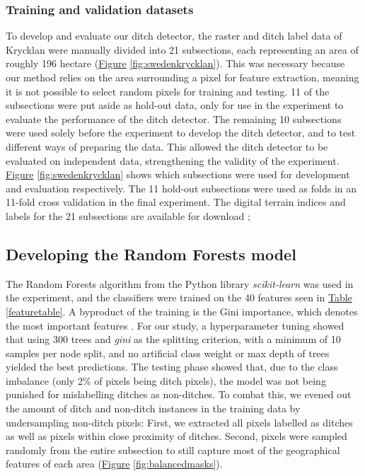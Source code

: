 \documentclass[11pt, review]{elsarticle} %
\begin{document}
\subsubsection{Training and validation datasets}
\label{trainingvalidationdatasets}
To develop and evaluate our ditch detector, the raster and ditch label data of Krycklan were manually divided into 21 subsections, each representing an area of roughly 196 hectare (\hyperref[fig:swedenkrycklan]{Figure} \ref{fig:swedenkrycklan}). This was necessary because our method relies on the area surrounding a pixel for feature extraction, meaning it is not possible to select random pixels for training and testing. 11 of the subsections were put aside as hold-out data, only for use in the experiment to evaluate the performance of the ditch detector. The remaining 10 subsections were used solely before the experiment to develop the ditch detector, and to test different ways of preparing the data. This allowed the ditch detector to be evaluated on independent data, strengthening the validity of the experiment. \hyperref[fig:swedenkrycklan]{Figure} \ref{fig:swedenkrycklan} shows which subsections were used for development and evaluation respectively. The 11 hold-out subsections were used as folds in an 11-fold cross validation in the final experiment. The digital terrain indices and labels for the 21 subsections are available for download \citep{dataset_processed};

\subsection{Developing the Random Forests model}

The Random Forests \citep{breiman} algorithm from the Python library \textit{scikit-learn} \citep{scikit-learn} was used in the experiment, and the classifiers were trained on the 40 features seen in \hyperref[featuretable]{Table} \ref{featuretable}. A byproduct of the training is the Gini importance, which denotes the most important features \citep{gini}. For our study, a hyperparameter tuning showed that using 300 trees and \textit{gini} as the splitting criterion, with a minimum of 10 samples per node split, and no artificial class weight or max depth of trees yielded the best predictions. The testing phase showed that, due to the class imbalance (only 2\% of pixels being ditch pixels), the model was not being punished for mislabelling ditches as non-ditches. To combat this, we evened out the amount of ditch and non-ditch instances in the training data by undersampling non-ditch pixels: First, we extracted all pixels labelled as ditches as well as pixels within close proximity of ditches. Second, pixels were sampled randomly from the entire subsection to still capture most of the geographical features of each area (\hyperref[fig:balancedmasks]{Figure} \ref{fig:balancedmasks}).
\end{document}
